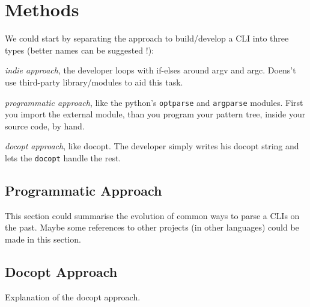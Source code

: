 \section{Methods}

We could start by separating the approach to build/develop a CLI into three types (better names can be suggested !):
\begin{compactitem}
\item \emph{indie approach}, the developer loops with if-elses around argv and argc. Doens't use third-party library/modules to aid this task.
\item \emph{programmatic approach}, like the python's \texttt{optparse} and \texttt{argparse} modules. First you import the external module, than you program your pattern tree, inside your source code, by hand.
\item \emph{docopt approach}, like docopt. The developer simply writes his docopt string and lets the \texttt{docopt} handle the rest.
\end{compactitem}

\subsection{Programmatic Approach}

This section could summarise the evolution of common ways to parse a CLIs on the past.  Maybe some references to other projects (in other languages) could be made in this section.

\subsection{Docopt Approach}

Explanation of the docopt approach.
